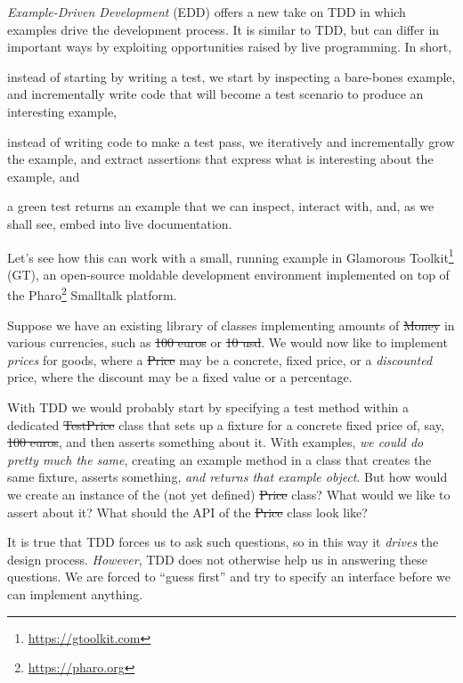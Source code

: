 \documentclass[sigplan,anonymous,review,10pt]{acmart}
\begin{document}
\emph{Example-Driven Development} (EDD) offers a new take on TDD in which examples drive the development process.
It is similar to TDD, but can differ in important ways by exploiting opportunities raised by live programming.
In short,
\begin{inparaenum}[(i)]
	\item instead of starting by writing a test, we start by inspecting a bare-bones example, and incrementally write code that will become a test scenario to produce an interesting example,
	\item instead of writing code to make a test pass, we iteratively and incrementally grow the example, and extract assertions that express what is interesting about the example,
and
	\item a green test returns an example that we can inspect, interact with, and, as we shall see, embed into live documentation.
\end{inparaenum}

Let's see how this can work with a small, running example in Glamorous Toolkit\footnote{\url{https://gtoolkit.com}} (GT), an open-source moldable development environment implemented on top of the Pharo\footnote{\url{https://pharo.org}} Smalltalk  platform.

Suppose we have an existing library of classes implementing amounts of \st{Money} in various currencies, such as \st{100 euros} or \st{10 usd}.
We would now like to implement \emph{prices} for goods, where a \st{Price} may be a concrete, fixed price, or a \emph{discounted} price, where the discount may be a fixed value or a percentage.

With TDD we would probably start by specifying a test method within a dedicated \st{TestPrice} class that sets up a fixture for a concrete fixed price of, say, \st{100 euros}, and then asserts something about it.
With examples, \emph{we could do pretty much the same}, creating an example method in a  class that creates the same fixture, asserts something, \emph{and returns that example object}.
But how would we create an instance of the (not yet defined) \st{Price} class?
What would we like to assert about it?
What should the API of the \st{Price} class look like?

It is true that TDD forces us to ask such questions, so in this way it \emph{drives} the design process.
\emph{However}, TDD does not otherwise help us in answering these questions.
We are forced to ``guess first'' and try to specify an interface before we can implement anything.
\end{document}
